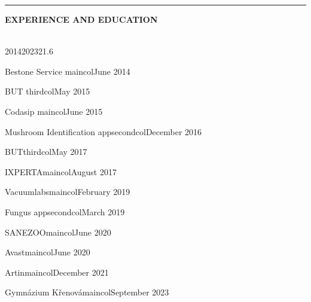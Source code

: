 \documentclass[10pt,A4]{article}
\newcommand{\cvsection}[2] {
\textcolor{sectcol}{\uppercase{\textbf{#1}}}
}
\newcommand{\cvsect}[4]{
	\textcolor{#3}{\hrule}
	\colorbox{#3}{ {\cvsection{#1}{#4}}}
}
\begin{document}
\begin{minipage}{0.4\textwidth}
	\vspace{56pt}
	\cvsect{Experience and Education}{0.4}{thirdcol}{textcol}\\[16pt]
	
	\hspace{60pt}\mbox{  }
	\vspace{-50pt}
	\begin{center}
		
		\begin{cvtimeline}{2014}{2023}{21.6}%
			
			
			
			{Bestone Service}
			{maincol}{June 2014}
			
			{BUT}
			{thirdcol}{May 2015}

			{Codasip}
			{maincol}{June 2015}
			
			{Mushroom Identification app}{secondcol}{December 2016}
			
			{BUT}{thirdcol}{May 2017}
			
			{IXPERTA}{maincol}{August 2017}
			    
			{Vacuumlabs}{maincol}{February 2019}    
			
			{Fungus app}{secondcol}{March 2019}
			
			{SANEZOO}{maincol}{June 2020}

			{Avast}{maincol}{June 2020}

			{Artin}{maincol}{December 2021}

			{Gymnázium Křenová}{maincol}{September 2023}
			
			     
		\end{cvtimeline}
	\end{center}
\end{minipage}
\end{document}
